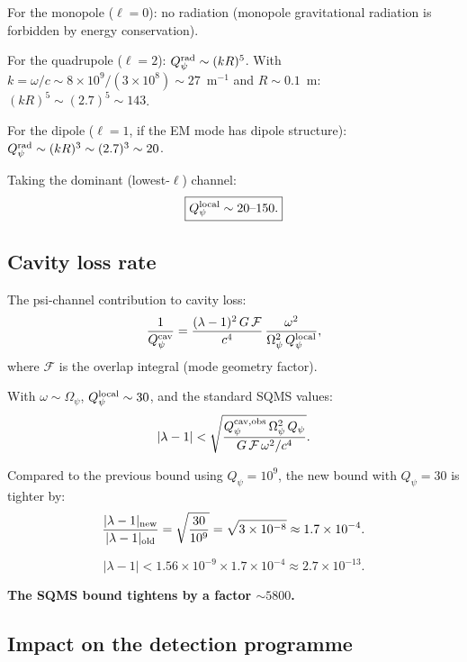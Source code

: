 \documentclass[11pt]{article}
\newcommand{\ee}[1]{\times 10^{#1}}
\newcommand{\Opsi}{\Omega_\psi}
\newcommand{\Qpsi}{Q_\psi}
\theoremstyle{definition}
\theoremstyle{remark}
\begin{document}
For the monopole ($\ell = 0$): no radiation (monopole gravitational
radiation is forbidden by energy conservation).

For the quadrupole ($\ell = 2$):
$\Qpsi^{\rm rad} \sim (kR)^5$. With $k = \omega/c \sim 8\ee{9}/(3\ee{8})
\sim 27$~m$^{-1}$ and $R \sim 0.1$~m: $(kR)^5 \sim (2.7)^5 \sim 143$.

For the dipole ($\ell = 1$, if the EM mode has dipole structure):
$\Qpsi^{\rm rad} \sim (kR)^3 \sim (2.7)^3 \sim 20$.

Taking the dominant (lowest-$\ell$) channel:
\begin{equation}
\boxed{\Qpsi^{\rm local} \sim 20\text{--}150.}
\end{equation}

\subsection{Cavity loss rate}

The psi-channel contribution to cavity loss:
\begin{equation}
\frac{1}{Q_\psi^{\rm cav}} = \frac{(\lambda-1)^2\,G\,\mathcal{F}}
{c^4}\,\frac{\omega^2}{\Opsi^2\,\Qpsi^{\rm local}},
\end{equation}
where $\mathcal{F}$ is the overlap integral (mode geometry factor).

With $\omega \sim \Opsi$, $\Qpsi^{\rm local} \sim 30$, and the
standard SQMS values:
\begin{equation}
|\lambda - 1| < \sqrt{\frac{Q_\psi^{\rm cav, obs}\,\Opsi^2\,\Qpsi}
{G\,\mathcal{F}\,\omega^2/c^4}}.
\end{equation}

Compared to the previous bound using $\Qpsi = 10^9$, the new bound
with $\Qpsi = 30$ is tighter by:
\begin{equation}
\frac{|\lambda-1|_{\rm new}}{|\lambda-1|_{\rm old}}
= \sqrt{\frac{30}{10^9}} = \sqrt{3\ee{-8}} \approx 1.7\ee{-4}.
\end{equation}

\begin{equation}
\boxed{|\lambda-1| < 1.56\ee{-9} \times 1.7\ee{-4} \approx 2.7\ee{-13}.}
\end{equation}

\textbf{The SQMS bound tightens by a factor $\sim 5800$.}

\subsection{Impact on the detection programme}
\end{document}
